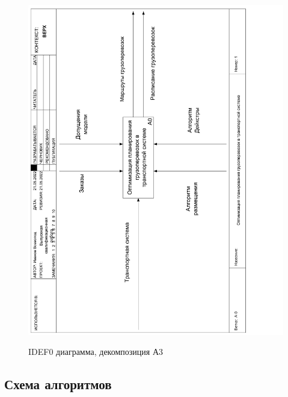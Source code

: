 \begin{figure}[h]
	\begin{center}
		{\includegraphics[scale=0.5, angle=-90, page=6]{img/idef0.pdf}}
		\caption{IDEF0 диаграмма, декомпозиция А3}
		\label{idef0:A3}
	\end{center}
\end{figure}

\subsection{Схема алгоритмов}


